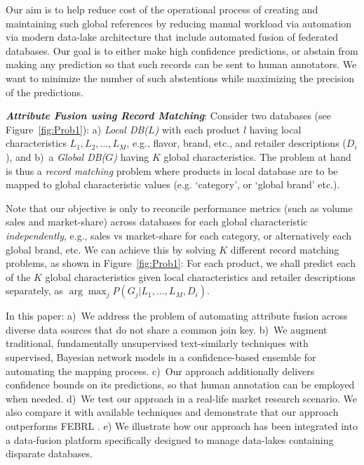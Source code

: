 Our aim is to help reduce cost of the operational process of creating and maintaining such global references by reducing manual workload via automation
via modern data-lake architecture that include automated fusion of federated databases. Our goal is to either make high confidence predictions, or abstain from making any prediction so that such records can be sent to human annotators. We want to minimize the number of such abstentions while maximizing the precision of the predictions.

\textbf{\textit{Attribute Fusion using Record Matching}}:
Consider two databases (see Figure~\ref{fig:Prob1}): a) \textit{Local DB($L$)} with each product $l$ having local characteristics $L_1, L_2,..., L_M$, e.g., flavor, brand, etc., and retailer descriptions ($D_i$), and b)~a \textit{Global DB($G$)} having $K$ global characteristics. The problem at hand is thus a \textit{record matching} problem where products in local database are to be mapped to global characteristic values (e.g. `category', or `global brand' etc.). 

Note that our objective is only to reconcile performance metrics (such as volume sales and market-share) across databases for each global characteristic \textit{independently}, e.g., sales vs market-share for each category, or alternatively each global brand, etc.
We can achieve this by solving $K$ different record matching problems,
as shown in Figure~\ref{fig:Prob1}: For each product, we shall predict each of the $K$ global characteristics
given local characteristics and retailer descriptions separately, as $\arg\max_j P(G_j | L_1, ..., L_M, D_i)$.

In this paper: a)~We address the problem of automating attribute fusion across diverse data sources that do not share a common join key.
b)~We augment traditional, fundamentally unsupervised text-similarly techniques with supervised, Bayesian network models in a confidence-based ensemble for automating the mapping process.
c)~Our approach additionally delivers confidence bounds on its predictions, so that human annotation can be employed when needed.
d)~We test our approach in a real-life market research scenario. We also compare it with available techniques \cite{christen2008febrl} and demonstrate that our approach outperforms FEBRL \cite{christen2008febrl}.
e) We illustrate how our approach has been integrated into a data-fusion platform\cite{singh2016visual} specifically designed to manage data-lakes containing disparate databases.

